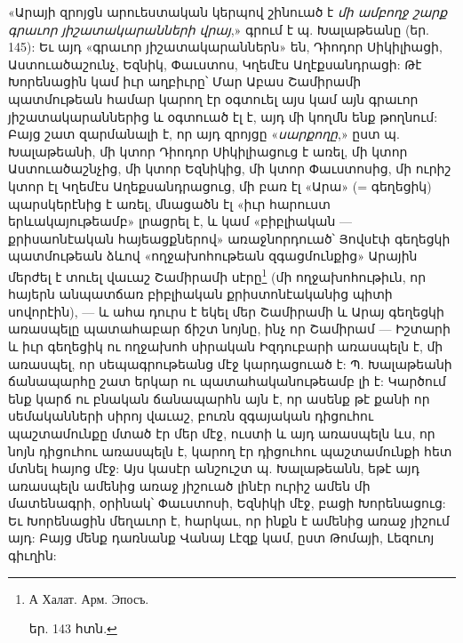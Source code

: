 \documentclass{article}
\begin{document}
{«Արայի զրոյցն արուեստական կերպով շինուած է \emph{մի ամբողջ շարք գրաւոր յիշատակարանների վրայ},» գրում է պ. Խալաթեանը (եր. 145): Եւ այդ «գրաւոր յիշատակարաններն» են, Դիոդոր Սիկիլիացի, Աստուածաշունչ, Եզնիկ, Փաւստոս, Կղեմէս Աղէքսանդրացի: Թէ Խորենացին կամ իւր աղբիւրը՝ Մար Աբաս Շամիրամի պատմութեան համար կարող էր օգտուել այս կամ այն գրաւոր յիշատակարաններից և օգտուած էլ է, այդ մի կողմն ենք թողնում: Բայց շատ զարմանալի է, որ այդ զրոյցը «\emph{սարքողը},» ըստ պ. Խալաթեանի, մի կտոր Դիոդոր Սիկիլիացուց է առել, մի կտոր Աստուածաշնչից, մի կտոր Եզնիկից, մի կտոր Փաւստոսից, մի ուրիշ կտոր էլ Կղեմէս Աղեքսանդրացուց, մի բառ էլ «Արա» (= գեղեցիկ) պարսկերէնից է առել, մնացածն էլ «իւր հարուստ երևակայութեամբ» լրացրել է, և կամ «բիբլիական — քրիսաոնէական հայեացքներով» առաջնորդուած՝ Յովսէփ գեղեցկի պատմութեան ձևով «ողջախոհութեան զգացմունքից» Արային մերժել է տուել վաւաշ Շամիրամի սէրը\footnote{\begin{russian}А Халат. Арм. Эпосъ.\end{russian} եր. 143 հտն.} (մի ողջախոհութիւն, որ հայերն անպատճառ բիբլիական քրիստոնէականից պիտի սովորէին), — և ահա դուրս է եկել մեր Շամիրամի և Արայ գեղեցկի առասպելը պատահաբար ճիշտ նոյնը, ինչ որ Շամիրամ — Իշտարի և իւր գեղեցիկ ու ողջախոհ սիրական Իզդուբարի առասպելն է, մի առասպել, որ սեպագրութեանց մէջ կարդացուած է: Պ. Խալաթեանի ճանապարհը շատ երկար ու պատահականութեամբ լի է: Կարծում ենք կարճ ու բնական ճանապարհն այն է, որ ասենք թէ քանի որ սեմականների սիրոյ վաւաշ, բուռն զգայական դիցուհու պաշտամունքը մտած էր մեր մէջ, ուստի և այդ առասպելն ևս, որ նոյն դիցուհու առասպելն է, կարող էր դիցուհու պաշտամունքի հետ մտնել հայոց մէջ: Այս կասէր անշուշտ պ. Խալաթեանն, եթէ այդ առասպելն ամենից առաջ յիշուած լինէր ուրիշ ամեն մի մատենագրի, օրինակ՝ Փաւստոսի, Եզնիկի մէջ, բացի Խորենացուց: Եւ Խորենացին մեղաւոր է, հարկաւ, որ ինքն է ամենից առաջ յիշում այդ: Բայց մենք դառնանք Վանայ Լէզք կամ, ըստ Թոմայի, Լեզուոյ գիւղին:

}
\end{document}
